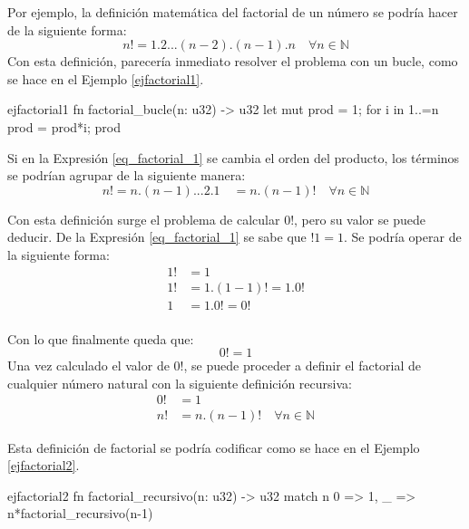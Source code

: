 Por ejemplo, la definición matemática del factorial de un número se podría hacer de la siguiente forma:
\begin{equation}
   \label{eq_factorial_1}
   n! = 1.2...(n-2).(n-1).n \quad \forall n \in \mathds{N} 	
\end{equation}
Con esta definición, parecería inmediato resolver el problema con un bucle, como se hace en el Ejemplo \ref{ejfactorial1}.

\vspace{1em}
\begin{EjemploCodigo}{ejfactorial1}
   fn factorial_bucle(n: u32) -> u32 {
      let mut prod = 1;
      for i in 1..=n {
         prod = prod*i;
      }
      prod
   }
\end{EjemploCodigo}

Si en la Expresión \ref{eq_factorial_1} se cambia el orden del producto, los términos se podrían agrupar de la siguiente manera:
\begin{equation}
   \label{eq_factorial_2}
   n! = n.(n-1)...2.1 \quad = n . (n-1)! \quad \forall n \in \mathds{N} 	
\end{equation}

Con esta definición surge el problema de calcular $0!$, pero su valor se puede deducir. De la Expresión \ref{eq_factorial_1} se sabe que $!1 = 1$. Se podría operar de la siguiente forma:
\begin{align*}
   1! &= 1 \\
   1! &= 1. (1-1)! = 1 . 0! \\
   1  &= 1 . 0! = 0! \\
\end{align*}

Con lo que finalmente queda que:
\begin{equation}
   \label{eq_factorial_3}
   0! = 1
\end{equation}
Una vez calculado el valor de $0!$, se puede proceder a definir el factorial de cualquier número natural con la siguiente definición recursiva:
\begin{align} \label{eq_factorial_4}		
   0! &= 1 \nonumber \\
   n! &= n . (n-1)! \quad \forall n \in \mathds{N} 
\end{align}

Esta definición de factorial se podría codificar como se hace en el Ejemplo \ref{ejfactorial2}.

\vspace{1em}
\begin{EjemploCodigo}{ejfactorial2}
   fn factorial_recursivo(n: u32) -> u32 {
      match n {
         0 => 1,
         _ => n*factorial_recursivo(n-1)
      }
   }
\end{EjemploCodigo}



